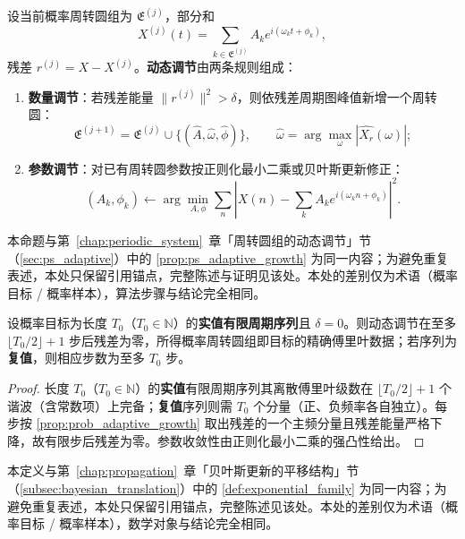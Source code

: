 \begin{definition}[概率周转圆组的动态调节]\label{def:prob_adaptive_adjustment}
设当前概率周转圆组为 $\mathfrak E^{(j)}$，部分和
\[
X^{(j)}(t)=\sum_{k\in\mathfrak E^{(j)}}A_k e^{i(\omega_k t+\phi_k)},
\]
残差 $r^{(j)}=X-X^{(j)}$。\textbf{动态调节}由两条规则组成：
\begin{enumerate}[label=(\roman*)]
    \item \textbf{数量调节}：若残差能量 $\|r^{(j)}\|^2>\delta$，则依残差周期图峰值新增一个周转圆：
    \[
    \mathfrak E^{(j+1)}=\mathfrak E^{(j)}\cup\{(\hat A,\hat\omega,\hat\phi)\},\qquad
    \hat\omega=\arg\max_\omega |\widehat{X_r}(\omega)|;
    \]
    \item \textbf{参数调节}：对已有周转圆参数按正则化最小二乘或贝叶斯更新修正：
    \[
    (A_k,\phi_k)\leftarrow\arg\min_{A,\phi}\sum_n\left|X(n)-\sum_kA_ke^{i(\omega_kn+\phi_k)}\right|^2.
    \]
\end{enumerate}
\end{definition}

\begin{proposition}[数量调节的单调性]\label{prop:prob_adaptive_growth}
本命题与第~\ref{chap:periodic_system}~章「周转圆组的动态调节」节（\cref{sec:ps_adaptive}）中的 \cref{prop:ps_adaptive_growth} 为同一内容；为避免重复表述，本处只保留引用锚点，完整陈述与证明见该处。本处的差别仅为术语（概率目标 / 概率样本），算法步骤与结论完全相同。
\end{proposition}

\begin{theorem}[动态调节的收敛性]\label{thm:prob_adaptive_convergence}
设概率目标为长度 $T_0$（$T_0\in\mathbb N$）的\textbf{实值有限周期序列}且 $\delta=0$。则动态调节在至多 $\lfloor T_0/2\rfloor+1$ 步后残差为零，所得概率周转圆组即目标的精确傅里叶数据；若序列为\textbf{复值}，则相应步数为至多 $T_0$ 步。
\end{theorem}

\begin{proof}
长度 $T_0$（$T_0\in\mathbb N$）的\textbf{实值}有限周期序列其离散傅里叶级数在 $\lfloor T_0/2\rfloor+1$ 个谐波（含常数项）上完备；\textbf{复值}序列则需 $T_0$ 个分量（正、负频率各自独立）。每步按 \cref{prop:prob_adaptive_growth} 取出残差的一个主频分量且残差能量严格下降，故有限步后残差为零。参数收敛性由正则化最小二乘的强凸性给出。
\end{proof}

\begin{definition}[指数族与自然参数]\label{def:exp_family_prob}
本定义与第~\ref{chap:propagation}~章「贝叶斯更新的平移结构」节（\cref{subsec:bayesian_translation}）中的 \cref{def:exponential_family} 为同一内容；为避免重复表述，本处只保留引用锚点，完整陈述见该处。本处的差别仅为术语（概率目标 / 概率样本），数学对象与结论完全相同。
\end{definition}

